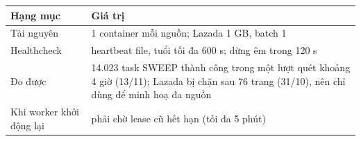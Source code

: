 \begin{xltabular}{\linewidth}{@{}L{40mm}Y@{}}
  \toprule
  \textbf{Hạng mục} & \textbf{Giá trị} \\
  \midrule
  Tài nguyên & 1 container mỗi nguồn; Lazada  1 GB, batch 1 \\
  Healthcheck & heartbeat file, tuổi tối đa 600 s; dừng êm trong 120 s \\
  Đo được & 14.023 task SWEEP thành công trong một lượt quét khoảng 4 giờ (13/11); Lazada bị chặn sau 76 trang (31/10), nên chỉ dùng để minh hoạ đa nguồn \\
  Khi worker khởi động lại & phải chờ lease cũ hết hạn (tối đa 5 phút) \\
  \bottomrule
\end{xltabular}
